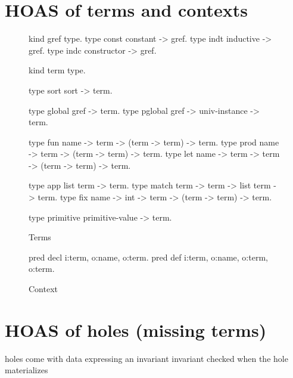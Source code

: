 \documentclass[a4paper, 11pt]{book}
\begin{document}
\section{HOAS of terms and contexts}\label{GALLINA}

\begin{figure}
\begin{elpicode}
kind gref type.
type const constant -> gref. %
type indt inductive -> gref. %
type indc constructor -> gref. %

kind term type.

type sort  sort -> term. %

type global gref -> term.
type pglobal gref -> univ-instance -> term.

type fun  name -> term -> (term -> term) -> term.         %
type prod name -> term -> (term -> term) -> term.         %
type let  name -> term -> term -> (term -> term) -> term. %

type app   list term -> term.                   %
type match term -> term -> list term -> term.   %
type fix   name -> int -> term -> (term -> term) -> term. %

type primitive primitive-value -> term.
\end{elpicode}
\caption[terms]{Terms\label{hoas:term}}
\end{figure}
  
\begin{figure}
\begin{elpicode}
pred decl i:term, o:name, o:term. %
pred def  i:term, o:name, o:term, o:term. %
\end{elpicode}
\caption[context]{Context\label{hoas:context}}
\end{figure}

\section{HOAS of holes (missing terms)}

holes come with data expressing an invariant
invariant checked when the hole materializes
\end{document}

